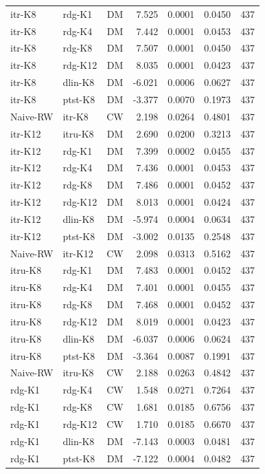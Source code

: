 \begin{table}[!t]
\begin{tabular}{llcrrrr}
itr-K8 & rdg-K1 & DM & 7.525 & 0.0001 & 0.0450 & 437 \\
itr-K8 & rdg-K4 & DM & 7.442 & 0.0001 & 0.0453 & 437 \\
itr-K8 & rdg-K8 & DM & 7.507 & 0.0001 & 0.0450 & 437 \\
itr-K8 & rdg-K12 & DM & 8.035 & 0.0001 & 0.0423 & 437 \\
itr-K8 & dlin-K8 & DM & -6.021 & 0.0006 & 0.0627 & 437 \\
itr-K8 & ptst-K8 & DM & -3.377 & 0.0070 & 0.1973 & 437 \\
Naive-RW & itr-K8 & CW & 2.198 & 0.0264 & 0.4801 & 437 \\
itr-K12 & itru-K8 & DM & 2.690 & 0.0200 & 0.3213 & 437 \\
itr-K12 & rdg-K1 & DM & 7.399 & 0.0002 & 0.0455 & 437 \\
itr-K12 & rdg-K4 & DM & 7.436 & 0.0001 & 0.0453 & 437 \\
itr-K12 & rdg-K8 & DM & 7.486 & 0.0001 & 0.0452 & 437 \\
itr-K12 & rdg-K12 & DM & 8.013 & 0.0001 & 0.0424 & 437 \\
itr-K12 & dlin-K8 & DM & -5.974 & 0.0004 & 0.0634 & 437 \\
itr-K12 & ptst-K8 & DM & -3.002 & 0.0135 & 0.2548 & 437 \\
Naive-RW & itr-K12 & CW & 2.098 & 0.0313 & 0.5162 & 437 \\
itru-K8 & rdg-K1 & DM & 7.483 & 0.0001 & 0.0452 & 437 \\
itru-K8 & rdg-K4 & DM & 7.401 & 0.0001 & 0.0455 & 437 \\
itru-K8 & rdg-K8 & DM & 7.468 & 0.0001 & 0.0452 & 437 \\
itru-K8 & rdg-K12 & DM & 8.019 & 0.0001 & 0.0423 & 437 \\
itru-K8 & dlin-K8 & DM & -6.037 & 0.0006 & 0.0624 & 437 \\
itru-K8 & ptst-K8 & DM & -3.364 & 0.0087 & 0.1991 & 437 \\
Naive-RW & itru-K8 & CW & 2.188 & 0.0263 & 0.4842 & 437 \\
rdg-K1 & rdg-K4 & CW & 1.548 & 0.0271 & 0.7264 & 437 \\
rdg-K1 & rdg-K8 & CW & 1.681 & 0.0185 & 0.6756 & 437 \\
rdg-K1 & rdg-K12 & CW & 1.710 & 0.0185 & 0.6670 & 437 \\
rdg-K1 & dlin-K8 & DM & -7.143 & 0.0003 & 0.0481 & 437 \\
rdg-K1 & ptst-K8 & DM & -7.122 & 0.0004 & 0.0482 & 437 \\

\end{tabular}
\end{table}
